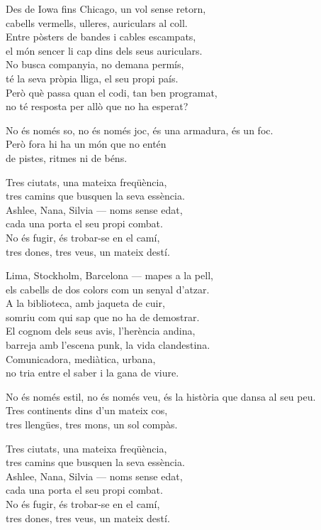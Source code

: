 \begin{lyrics}
Des de Iowa fins Chicago, un vol sense retorn,\\
cabells vermells, ulleres, auriculars al coll.\\
Entre pòsters de bandes i cables escampats,\\
el món sencer li cap dins dels seus auriculars.\\
No busca companyia, no demana permís,\\
té la seva pròpia lliga, el seu propi país.\\
Però què passa quan el codi, tan ben programat,\\
no té resposta per allò que no ha esperat?

No és només so, no és només joc,
és una armadura, és un foc.\\
Però fora hi ha un món que no entén\\
de pistes, ritmes ni de béns.

Tres ciutats, una mateixa freqüència,\\
tres camins que busquen la seva essència.\\
Ashlee, Nana, Silvia — noms sense edat,\\
cada una porta el seu propi combat.\\
No és fugir, és trobar-se en el camí,\\
tres dones, tres veus, un mateix destí.

Lima, Stockholm, Barcelona — mapes a la pell,\\
els cabells de dos colors com un senyal d'atzar.\\
A la biblioteca, amb jaqueta de cuir,\\
somriu com qui sap que no ha de demostrar.\\
El cognom dels seus avis, l'herència andina,\\
barreja amb l'escena punk, la vida clandestina.\\
Comunicadora, mediàtica, urbana,\\
no tria entre el saber i la gana de viure.

No és només estil, no és només veu,
és la història que dansa al seu peu.\\
Tres continents dins d'un mateix cos,\\
tres llengües, tres mons, un sol compàs.

Tres ciutats, una mateixa freqüència,\\
tres camins que busquen la seva essència.\\
Ashlee, Nana, Silvia — noms sense edat,\\
cada una porta el seu propi combat.\\
No és fugir, és trobar-se en el camí,\\
tres dones, tres veus, un mateix destí.


\end{lyrics}
